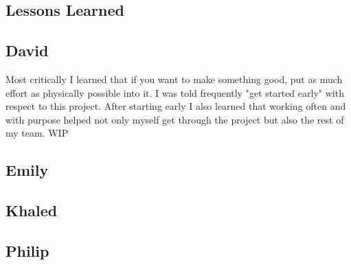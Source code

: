 \begin{homeworkProblem}
	\chapter{Lessons Learned}
	\section{David}
	Most critically I learned that if you want to make something good, put as much effort as physically possible into it. I was told frequently "get started early" with respect to this project. After starting early I also learned that working often and with purpose helped not only myself get through the project but also the rest of my team. WIP
	\section{Emily}
	\section{Khaled}
	\section{Philip}
\end{homeworkProblem}